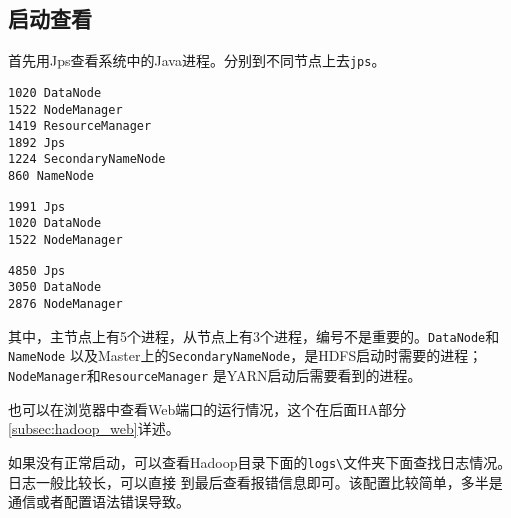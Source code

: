 \subsection{启动查看}
首先用Jps查看系统中的Java进程。分别到不同节点上去\lstinline{jps}。
\begin{lstlisting}[style=mysh,title=Master节点]
1020 DataNode
1522 NodeManager
1419 ResourceManager
1892 Jps
1224 SecondaryNameNode
860 NameNode
\end{lstlisting}
\begin{lstlisting}[style=mysh,title=Slave1节点]
1991 Jps
1020 DataNode
1522 NodeManager
\end{lstlisting}
\begin{lstlisting}[style=mysh,title=Slave2节点]
4850 Jps
3050 DataNode
2876 NodeManager
\end{lstlisting}
其中，主节点上有5个进程，从节点上有3个进程，编号不是重要的。\lstinline{DataNode}和\lstinline{NameNode}
以及Master上的\lstinline{SecondaryNameNode}，是HDFS启动时需要的进程；\lstinline{NodeManager}和\lstinline{ResourceManager}
是YARN启动后需要看到的进程。

也可以在浏览器中查看Web端口的运行情况，这个在后面HA部分\ref{subsec:hadoop_web}详述。

如果没有正常启动，可以查看Hadoop目录下面的\lstinline{logs\}文件夹下面查找日志情况。日志一般比较长，可以直接
到最后查看报错信息即可。该配置比较简单，多半是通信或者配置语法错误导致。
